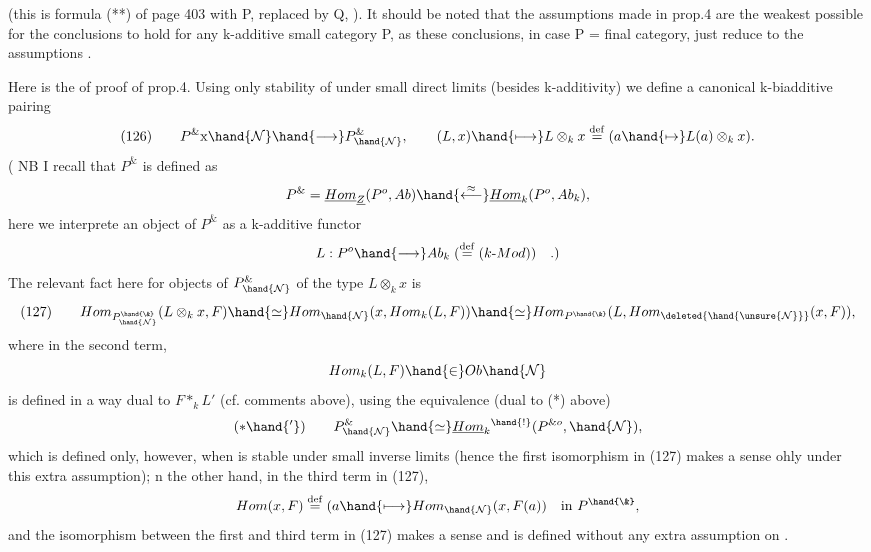 
 (this is formula (**) of page 403  with
P,  replaced by Q, ). It should be noted that the assumptions  made
in prop.4 are the weakest possible for the conclusions to hold
\deleted{(}for any k-additive small category P\deleted{)}, as these conclusions, in case
P = final category, just reduce to the assumptions .

Here is the   of proof of prop.4. Using only stability
of  under small direct limits (besides k-additivity) we define a
canonical  k-biadditive pairing
\[ (126) \qquad P^{\&} \mathrm{x} \hand{\mathcal{N}} \hand{\longrightarrow} P^{\&}_{\hand{\mathcal{N}}} , \qquad (L,x) \hand{\longmapsto} L\otimes_k x \overset{\mathrm{def}}{=} (a \hand{\mapsto} L(a)\otimes_k x ). \]
( NB I recall that $P^{\&}$ is defined as
\[ P^{\&} = \underline{Hom}_{\underline{Z}}(P^{o},Ab) \hand{\overset{\approx}{\longleftarrow}} \underline{Hom}_k(P^{o}, Ab_k ) , \]
here we interprete an object of $P^{\&}$ as a k-additive functor
\[ L : P^{o} \hand{\longrightarrow} Ab_k \; (\overset{\mathrm{def}}{=} (k\text{-}Mod)) \quad .) \]
The relevant fact here for objects of $P^{\&}_{\hand{\mathcal{N}}}$ of the type $L\otimes_k x$ is
\[ (127) \qquad Hom_{P^{\hand{\&}}_{\hand{\mathcal{N}}}}(L\otimes_k x,F) \hand{\simeq} Hom_{\hand{\mathcal{N}}}(x,Hom_k(L,F)) \hand{\simeq} Hom_{P^{\hand{\&}}}(L, Hom_{\deleted{\hand{\unsure{\mathcal{N}}}}}(x,F)) , \]
where in the second term,
\[ Hom_k(L,F) \hand{\in} Ob \hand{\mathcal{N}} \]
is defined in a way dual to $F *_k L'$ (cf. comments above), using the
equivalence (dual to (*) above)
\[ (*\hand{'}) \qquad P^{\&}_{\hand{\mathcal{N}}} \hand{\simeq} \underline{Hom}_k{}^{\hand{!}}(P^{\& o}, \hand{\mathcal{N}}) , \]
which is defined only, however, when  is stable under small inverse
limits (hence the first isomorphism in (127) makes a sense ohly under
this extra assumption); n the other hand, in the third term in (127),
\[ Hom(x,F) \overset{\mathrm{def}}{=} (a \hand{\longmapsto} Hom_{\hand{\mathcal{N}}}(x,F(a)) \quad \text{in } P^{\hand{\&}} , \]
and the isomorphism between the first and third term in (127) makes a
sense and is defined without any extra assumption on .

